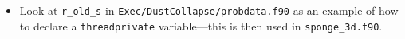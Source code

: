 \begin{itemize}
\begin{itemize}
\item Look at {\tt r\_old\_s} in {\tt Exec/DustCollapse/probdata.f90} as an
  example of how to declare a {\tt threadprivate} variable---this is then used
  in {\tt sponge\_3d.f90}.

\end{itemize}

\end{itemize}


